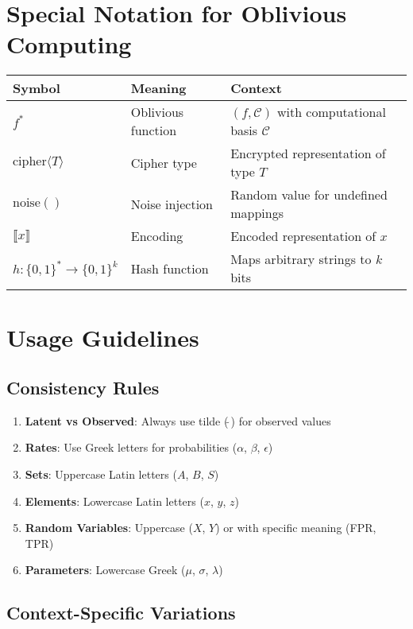 \section{Special Notation for Oblivious Computing}

\begin{tabular}{|l|l|l|}
\hline
\textbf{Symbol} & \textbf{Meaning} & \textbf{Context} \\
\hline
$f^*$ & Oblivious function & $(f, \mathcal{C})$ with computational basis $\mathcal{C}$ \\
$\text{cipher}\langle T \rangle$ & Cipher type & Encrypted representation of type $T$ \\
$\text{noise}()$ & Noise injection & Random value for undefined mappings \\
$\llbracket x \rrbracket$ & Encoding & Encoded representation of $x$ \\
$h: \{0,1\}^* \to \{0,1\}^k$ & Hash function & Maps arbitrary strings to $k$ bits \\
\hline
\end{tabular}

\section{Usage Guidelines}

\subsection{Consistency Rules}

\begin{enumerate}
\item \textbf{Latent vs Observed}: Always use tilde ($\tilde{~}$) for observed values
\item \textbf{Rates}: Use Greek letters for probabilities ($\alpha$, $\beta$, $\epsilon$)
\item \textbf{Sets}: Uppercase Latin letters ($A$, $B$, $S$)
\item \textbf{Elements}: Lowercase Latin letters ($x$, $y$, $z$)
\item \textbf{Random Variables}: Uppercase ($X$, $Y$) or with specific meaning (FPR, TPR)
\item \textbf{Parameters}: Lowercase Greek ($\mu$, $\sigma$, $\lambda$)
\end{enumerate}

\subsection{Context-Specific Variations}

